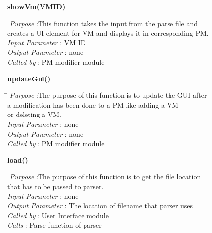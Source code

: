\documentclass[a4paper,11pt]{article}
\begin{document}
\begin{itemize}
\begin{figure}[h]
\end{figure}




\textbf{showVm(VM\textunderscore ID)}
  
\begin{tabbing}
\hspace*{4cm}\=  \kill
 \textit{Purpose} \> :This function takes the input from the parse file and \\ \>creates a UI element for VM and displays it in corresponding PM.\\
  \textit{Input Parameter} \> : VM ID \\
  \textit{Output Parameter} \> : none \\
  \textit{Called by} \> : PM modifier module 
  
\end{tabbing}

\textbf{updateGui()}
  
\begin{tabbing}
\hspace*{4cm}\=  \kill
 \textit{Purpose} \> :The purpose of this function is to update the GUI after\\ \> a modification has been done to a PM like adding a VM \\ \>or deleting a VM.\\
  \textit{Input Parameter} \> : none \\
  \textit{Output Parameter} \> : none \\
  \textit{Called by} \> : PM modifier module 
  
\end{tabbing}

\textbf{load()}
  
\begin{tabbing}
\hspace*{4cm}\=  \kill
 \textit{Purpose} \> :The purpose of this function is to get the file location\\ \> that has to be passed to parser.\\
  \textit{Input Parameter} \> : none \\
  \textit{Output Parameter} \> : The location of filename that parser uses \\
  \textit{Called by} \> : User Interface module \\
  \textit{Calls} \> : Parse function of parser
\end{tabbing}


\end{itemize}
\end{document}
